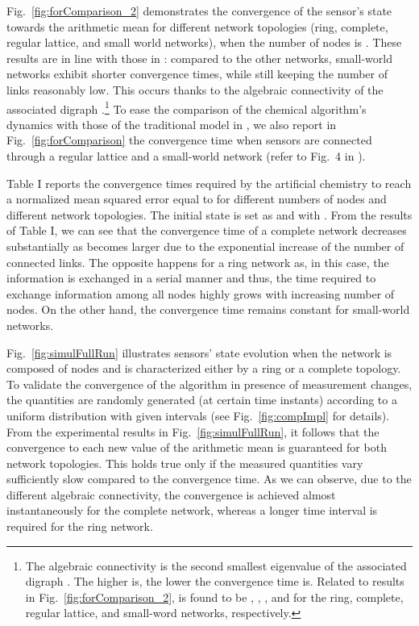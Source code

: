 \documentclass[journal]{IEEEtran}
\begin{document}
{{Fig.~\ref{fig:forComparison_2} demonstrates the convergence of the sensor's state towards} the arithmetic mean for different network topologies (ring, complete, regular lattice, and small world networks), when the number of nodes is . 
These results are in line with those in \cite{OlFa07}: compared to the other networks, small-world networks exhibit shorter convergence times, while still keeping the number of links reasonably low. This occurs thanks to the algebraic connectivity of the associated digraph .\footnote{The algebraic connectivity is the second smallest eigenvalue  of the associated digraph . The higher  is, the lower the convergence time is. Related to results in Fig.~\ref{fig:forComparison_2},  is found to be , , , and  for the ring, complete, regular lattice, and small-word networks, respectively.} To ease the comparison of the chemical algorithm's dynamics with those of the traditional model in \cite{OlFa07}, we also report in Fig.~\ref{fig:forComparison} the convergence time when  sensors are connected through a regular lattice and a small-world network (refer to Fig.~4 in \cite{OlFa07}).}




{Table I reports the convergence times required by the artificial chemistry to reach a normalized mean squared error equal to  for different numbers of nodes and different network topologies. The initial state is set as  {and}  with . } 
{From the results of Table I, we can see that the convergence time of a complete network decreases substantially as  becomes larger {due to the exponential increase of the number of connected links.} The opposite happens for a ring network as, in this case, the information is exchanged in a serial manner and thus, the time required to exchange information among all nodes highly grows with increasing number of nodes.} {On the other hand, the convergence time remains constant for small-world networks.}

Fig.~\ref{fig:simulFullRun} illustrates sensors' state evolution when the network {is composed of}  nodes and is characterized either by a ring or a complete topology. To validate the convergence of the algorithm in presence of measurement changes, the quantities  {are randomly generated (at certain time instants) according to a uniform distribution} with given intervals (see Fig.~\ref{fig:compImpl} for details). From the experimental results in Fig.~\ref{fig:simulFullRun}, it follows that the convergence to each new value of the arithmetic mean is guaranteed for both network topologies. 
{This holds true only if the measured quantities vary sufficiently slow compared to the convergence time.}
As we can observe, due to the different algebraic connectivity, the convergence is achieved almost instantaneously for the complete network, whereas a longer time interval is required for the ring network. 
\end{document}
